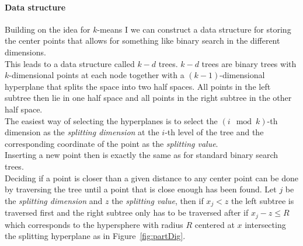 \documentclass[a4paper,12pt,headsepline]{scrartcl}
\begin{document}
    \paragraph{Data structure}
    Building on the idea for $k$-means I we can construct a data structure for storing
    the center points that allows for something like binary search in the different dimensions.\\
    This leads to a data structure called $k-d$ trees. $k-d$ trees
    are binary trees with $k$-dimensional points at each node together with a $(k-1)$-dimensional
    hyperplane that splits the space into two half spaces. All points in the left subtree 
    then lie in one half space and all points in the right subtree in the other half space.\\
    The easiest way of selecting the hyperplanes is to select the $(i \mod k)$-th dimension as the 
    \textit{splitting dimension} at the $i$-th level of the tree and the corresponding coordinate of
    the point as the \textit{splitting value}.\\
    Inserting a new point then is exactly the same as for standard binary search trees.\\
    Deciding if a point is closer than a given distance to any center point can be done by
    traversing the tree until a point that is close enough has been found.
    Let $j$ be the \textit{splitting dimension} and $z$ the \textit{splitting value}, then
    if $x_j < z$ the left subtree is traversed first and the right subtree
    only has to be traversed after if $x_j - z \leq R$ which corresponds 
    to the hypersphere with radius $R$ centered at $x$ intersecting the
    splitting hyperplane as in Figure~\ref{fig:partDig}. 
\end{document}
